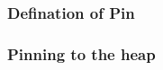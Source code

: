 % 
\begin{frame}[fragile]
    \frametitle{Defination of Pin}
\end{frame}
% 
% 
% 
% 
% 
\begin{frame}[fragile]
    \frametitle{Pinning to the heap}
\end{frame}
% 
% 
% 
% 

